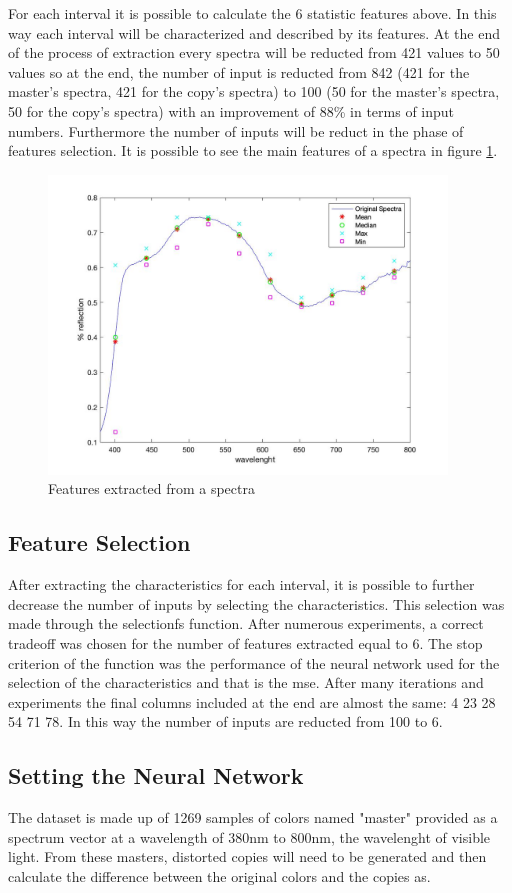 \documentclass{article}
\begin{document}
For each interval it is possible to calculate the 6 statistic features above. In this way each interval will be characterized and described by its features. At the end of the process of extraction every spectra will be reducted from 421 values to 50 values so at the end, the number of input is reducted from 842 (421 for the master's spectra, 421 for the copy's spectra) to 100 (50 for the master's spectra, 50 for the copy's spectra) with an improvement of 88\% in terms of input numbers. Furthermore the number of inputs will be reduct in the phase of features selection. It is possible to see the main features of a spectra in figure \ref{fig:features}. 

\begin{figure}[!h]
\center
  \includegraphics[width=300pt]{img/features.jpg}
  \caption{Features extracted from a spectra}
  \label{fig:features}
\end{figure}
 

\subsection{Feature Selection} 
After extracting the characteristics for each interval, it is possible to further decrease the number of inputs by selecting the characteristics. This selection was made through the selectionfs function. After numerous experiments, a correct tradeoff was chosen for the number of features extracted equal to 6. The stop criterion of the function was the performance of the neural network used for the selection of the characteristics and that is the mse. After many iterations and experiments the final columns included at the end are almost the same:  4 23 28 54 71 78. In this way the number of inputs are reducted from 100 to 6.
 
\subsection{Setting the Neural Network} 
The dataset is made up of 1269 samples of colors named "master" provided as a spectrum vector at a wavelength of 380nm to 800nm, the wavelenght of visible light. From these masters, distorted copies will need to be generated and then calculate the difference between the original colors and the copies as.
\end{document}
